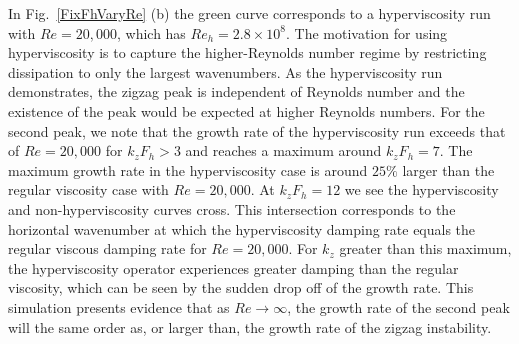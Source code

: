 In Fig.~\ref{FixFhVaryRe} (b) the green curve corresponds to a hyperviscosity run with $Re=20{,}000$, which has $Re_{h}=2.8\times 10^{8}$. The motivation for using hyperviscosity is to capture the higher-Reynolds number regime by restricting dissipation to only the largest wavenumbers. As the hyperviscosity run demonstrates, the zigzag peak is independent of Reynolds number and the existence of the peak would be expected at higher Reynolds numbers. For the second peak, we note that the growth rate  of the hyperviscosity run exceeds that of $Re=20{,}000$ for $k_{z}F_{h}>3$ and reaches a maximum around $k_{z}F_{h}=7$. The maximum growth rate in the hyperviscosity case is around $25\%$ larger than the regular viscosity case with $Re=20{,}000$. At $k_{z}F_{h}=12$ we see the hyperviscosity and non-hyperviscosity curves cross. This intersection corresponds to the horizontal wavenumber at which the hyperviscosity damping rate equals the regular viscous damping rate for $Re=20{,}000$. For $k_{z}$ greater than this maximum, the hyperviscosity operator experiences greater damping than the regular viscosity, which can be seen by the sudden drop off of the growth rate. This simulation presents evidence that as $Re\rightarrow \infty$, the growth rate of the second peak will the same order as, or larger than, the growth rate of the zigzag instability. 

